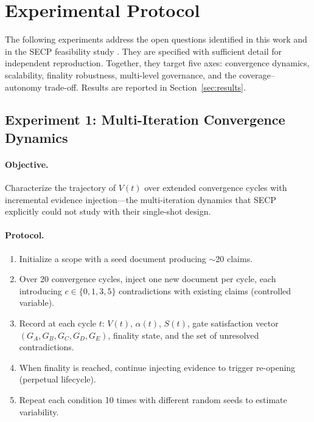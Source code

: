 \documentclass[11pt]{article}
\begin{document}
\section{Experimental Protocol}
\label{sec:proposed-experiments}

The following experiments address the open questions identified in this work and in the SECP feasibility study \cite{delachica2026}. They are specified with sufficient detail for independent reproduction. Together, they target five axes: convergence dynamics, scalability, finality robustness, multi-level governance, and the coverage--autonomy trade-off. Results are reported in Section~\ref{sec:results}.

\subsection{Experiment 1: Multi-Iteration Convergence Dynamics}

\paragraph{Objective.} Characterize the trajectory of $V(t)$ over extended convergence cycles with incremental evidence injection---the multi-iteration dynamics that SECP \cite{delachica2026} explicitly could not study with their single-shot design.

\paragraph{Protocol.}
\begin{enumerate}
  \item Initialize a scope with a seed document producing $\sim$20 claims.
  \item Over 20 convergence cycles, inject one new document per cycle, each introducing $c \in \{0, 1, 3, 5\}$ contradictions with existing claims (controlled variable).
  \item Record at each cycle $t$: $V(t)$, $\alpha(t)$, $S(t)$, gate satisfaction vector $(G_A, G_B, G_C, G_D, G_E)$, finality state, and the set of unresolved contradictions.
  \item When finality is reached, continue injecting evidence to trigger re-opening (perpetual lifecycle).
  \item Repeat each condition 10 times with different random seeds to estimate variability.
\end{enumerate}
\end{document}
